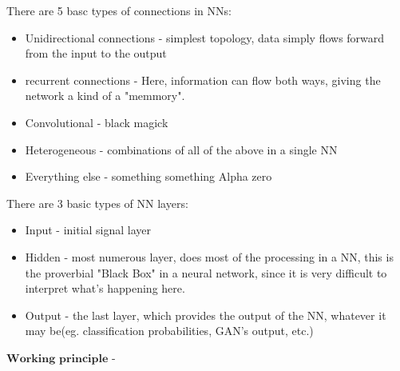 \documentclass{report}
\begin{document}


{
	There are 5 basc types of connections in NNs:
	\begin{itemize}
		\item Unidirectional connections - simplest topology, data simply flows forward from the input to the output
		\item recurrent connections - Here, information can flow both ways, giving the network a kind of a "memmory".
		\item Convolutional - black magick
		\item Heterogeneous - combinations of all of the above in a single NN
		\item Everything else - something something Alpha zero
	\end{itemize}
}

{
	There are 3 basic types of NN layers:
	\begin{itemize}
		\item Input - initial signal layer
		\item Hidden - most numerous layer, does most of the processing in a NN, this is the proverbial "Black Box" in a neural network, since it is very difficult to interpret what's happening here.
		\item Output - the last layer, which provides the output of the NN, whatever it may be(eg. classification probabilities, GAN's output, etc.)
	\end{itemize}
	$\textbf{Working principle}$ - 
}
\end{document}

